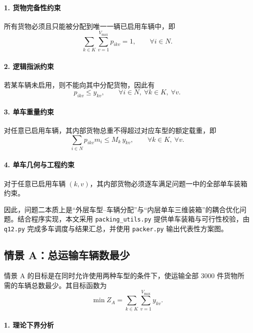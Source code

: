 \documentclass{MMCStyle}
\begin{document}
\paragraph{1. 货物完备性约束}
所有货物必须且只能被分配到唯一一辆已启用车辆中，即
\begin{equation}
\sum_{k\in K}\sum_{v=1}^{V_{\max}}p_{ikv}=1,\qquad \forall i\in N.
\end{equation}

\paragraph{2. 逻辑指派约束}
若某车辆未启用，则不能向其中分配货物，因此有
\begin{equation}
p_{ikv}\le y_{kv},\qquad \forall i\in N,\ \forall k\in K,\ \forall v.
\end{equation}

\paragraph{3. 单车重量约束}
对任意已启用车辆，其内部货物总重不得超过对应车型的额定载重，即
\begin{equation}
\sum_{i\in N}p_{ikv}m_i\le M_k\,y_{kv},\qquad \forall k\in K,\ \forall v.
\end{equation}

\paragraph{4. 单车几何与工程约束}
对于任意已启用车辆 $(k,v)$，其内部货物必须逐车满足问题一中的全部单车装箱约束。

因此，问题二本质上是“外层车型--车辆分配”与“内层单车三维装箱”的耦合优化问题。结合程序实现，本文采用 \texttt{packing\_utils.py} 提供单车装箱与可行性校验，由 \texttt{q12.py} 完成多车调度与结果汇总，并使用 \texttt{packer.py} 输出代表性方案图。

\subsection{情景 A：总运输车辆数最少}

情景 A 的目标是在同时允许使用两种车型的条件下，使运输全部 3000 件货物所需的车辆总数最少。其目标函数为
\begin{equation}
\min Z_A=\sum_{k\in K}\sum_{v=1}^{V_{\max}}y_{kv}.
\end{equation}

\paragraph{1. 理论下界分析}
\end{document}
